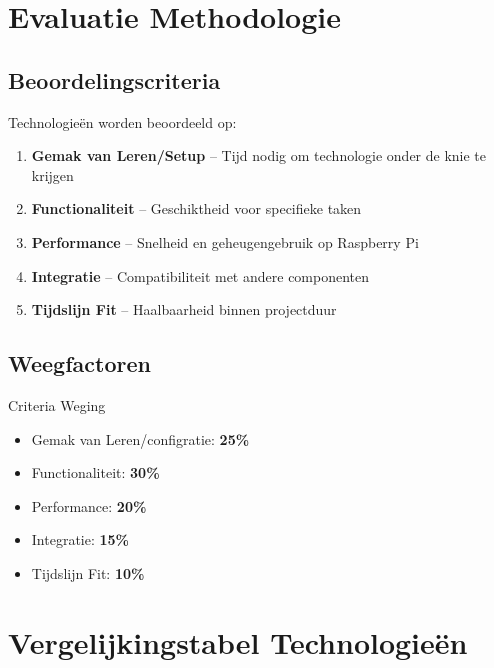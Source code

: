 \documentclass[11pt,a4paper]{scrartcl}
\begin{document}
\section{Evaluatie Methodologie}

\subsection{Beoordelingscriteria}
Technologieën worden beoordeeld op:
\begin{enumerate}[leftmargin=*]
    \item \textbf{Gemak van Leren/Setup} -- Tijd nodig om technologie onder de knie te krijgen
    \item \textbf{Functionaliteit} -- Geschiktheid voor specifieke taken
    \item \textbf{Performance} -- Snelheid en geheugengebruik op Raspberry Pi
    \item \textbf{Integratie} -- Compatibiliteit met andere componenten
    \item \textbf{Tijdslijn Fit} -- Haalbaarheid binnen projectduur
\end{enumerate}

\subsection{Weegfactoren}
\begin{infobox}{Criteria Weging}
\begin{itemize}[leftmargin=*,nosep]
    \item Gemak van Leren/configratie: \textbf{25\%}
    \item Functionaliteit: \textbf{30\%}
    \item Performance: \textbf{20\%}
    \item Integratie: \textbf{15\%}
    \item Tijdslijn Fit: \textbf{10\%}
\end{itemize}
\end{infobox}


\section{Vergelijkingstabel Technologieën}
\end{document}
